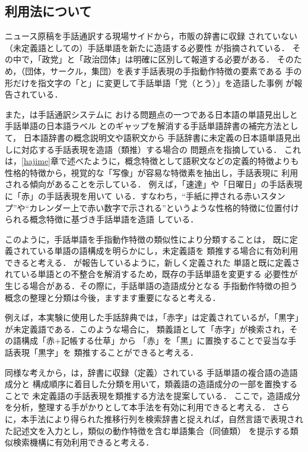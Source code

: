 \subsection{利用法について}

ニュース原稿を手話通訳する現場サイドから，市販の辞書に収録
されていない（未定義語としての）手話単語を新たに造語する必要性
が指摘されている\cite{Shigaki1991}．
その中で，「政党」と「政治団体」は明確に区別して報道する必要がある．
そのため，（団体，サークル，集団）を表す手話表現の手指動作特徴の要素である
手の形だけを指文字の「と」に変更して手話単語「党（とう）」を造語した事例
が報告されている．

また，\cite{Tokuda1998}は手話通訳システムに
おける問題点の一つである日本語の単語見出しと手話単語の日本語ラベル
とのギャップを解消する手話単語辞書の補完方法として，
日本語辞書の概念説明文や語釈文から
手話辞書に未定義の日本語単語見出しに対応する手話表現を造語（類推）する場合の
問題点を指摘している．
これは，\ref{hajime}章で述べたように，概念特徴として語釈文などの定義的特徴よりも
性格的特徴から，視覚的な「写像」が容易な特徴素を抽出し，手話表現に
利用される傾向があることを示している．
例えば，「速達」や「日曜日」の手話表現に「赤」の手話表現を用いて
いる．すなわち，``手紙に押される赤いスタンプ''や``カレンダー上で赤い数字で示される''というような性格的特徴に位置付けられる概念特徴に基づき手話単語を造語
している．

このように，手話単語を手指動作特徴の類似性により分類することは，
既に定義されている単語の語構成を明らかにし，未定義語を
類推する場合に有効利用できると考える．
\cite{Honna1994}が報告しているように，新しく定義された
単語と既に定義されている単語との不整合を解消するため，既存の手話単語を変更する
必要性が生じる場合がある．その際に，手話単語の造語成分となる
手指動作特徴の担う概念の整理と分類は今後，ますます重要になると考える．

例えば，本実験に使用した手話辞典では，「赤字」は定義されているが，「黒字」が未定義語である．このような場合に，
類義語として「赤字」が検索され，その語構成「赤+記帳する仕草」から
「赤」を「黒」に置換することで妥当な手話表現「黒字」\cite{Ito1982}を
類推することができると考える．

同様な考えから，\cite{Adachi1993}は，辞書に収録（定義）されている
手話単語の複合語の造語成分と
構成順序に着目した分類を用いて，類義語の造語成分の一部を置換することで
未定義語の手話表現を類推する方法を提案している．
ここで，造語成分を分析，整理する手がかりとして本手法を有効に利用できると考える．
さらに，本手法により得られた推移行列を検索辞書と捉えれば，自然言語で表現された記述文を入力とし，類似の動作特徴を含む単語集合（同値類）
を提示する類似検索機構に有効利用できると考える．

